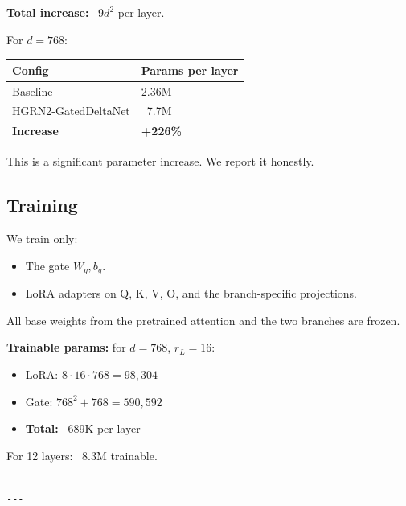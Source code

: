 \textbf{Total increase:} ~9$d^2$ per layer.

For $d = 768$:

\begin{table}[H]
\centering
\small
\begin{tabular}{ll}
\toprule
\textbf{Config} & \textbf{Params per layer} \\
\midrule
Baseline & 2.36M \\
HGRN2-GatedDeltaNet & ~7.7M \\
\textbf{Increase} & \textbf{+226\%} \\
\bottomrule
\end{tabular}
\end{table}

This is a significant parameter increase. We report it honestly.

\subsection{Training}

We train only:
\begin{itemize}
\item The gate $W_g, b_g$.
\item LoRA adapters on Q, K, V, O, and the branch-specific projections.

\end{itemize}
All base weights from the pretrained attention and the two branches are 
frozen.

\textbf{Trainable params:} for $d = 768$, $r_L = 16$:
\begin{itemize}
\item LoRA: $8 \cdot 16 \cdot 768 = 98,304$
\item Gate: $768^2 + 768 = 590,592$
\item \textbf{Total:} ~689K per layer

\end{itemize}
For 12 layers: ~8.3M trainable.
\begin{lstlisting}

---
\end{lstlisting}